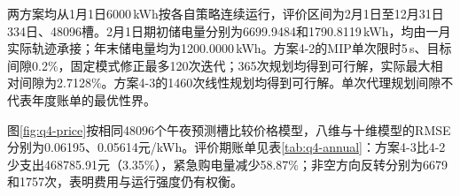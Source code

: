 两方案均从1月1日6000\,kWh按各自策略连续运行，评价区间为2月1日至12月31日334日、48096槽。2月1日期初储电量分别为6699.9484和1790.8119\,kWh，均由一月实际轨迹承接；年末储电量均为1200.0000\,kWh。方案4-2的MIP单次限时5\,s、目标间隙0.2\%，固定模式修正最多120次迭代；365次规划均得到可行解，实际最大相对间隙为2.7128\%。方案4-3的1460次线性规划均得到可行解。单次代理规划间隙不代表年度账单的最优性界。

图\ref{fig:q4-price}按相同48096个午夜预测槽比较价格模型，八维与十维模型的RMSE分别为0.06195、0.05614元/kWh。评价期账单见表\ref{tab:q4-annual}：方案4-3比4-2少支出468785.91元（3.35\%），紧急购电量减少58.87\%；非空方向反转分别为6679和1757次，表明费用与运行强度仍有权衡。
